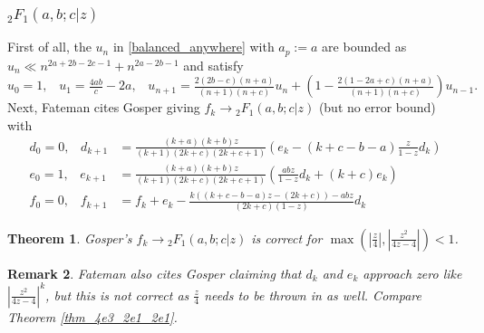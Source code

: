 \documentclass[12pt]{article}
\numberwithin{equation}{section}
\newtheorem{theorem}{Theorem}[section]
\newtheorem{remark}[theorem]{Remark}
\newcommand{\Head}[3] {{}_{#1}{#2}_{#3}}
\begin{document}
\subsubsection{$\Head{2}{F}{1}(a,b;c|z)$}
First of all, the $u_n$ in \eqref{balanced_anywhere} with $a_p:=a$ are bounded as $u_n \ll n^{2a+2b-2c-1} + n^{2a-2b-1}$ and satisfy
\begin{equation*}
u_0 = 1\text{,} \quad u_1 = \tfrac{4ab}{c}-2a\text{,} \quad 
u_{n+1} = \tfrac{2(2b-c)(n+a)}{(n+1)(n+c)} u_n + (1-\tfrac{2(1-2a+c)(n+a)}{(n+1)(n+c)}) u_{n-1}\text{.}
\end{equation*}
Next, Fateman cites Gosper giving $f_k \to \Head{2}{F}{1}(a,b;c|z)$ (but no error bound) with 
\begin{equation*}
\begin{aligned}
d_0 = 0\text{,} \quad d_{k+1} & = \tfrac{(k+a)(k+b)z}{(k+1)(2k+c)(2k+c+1)}(e_k-(k+c-b-a)\tfrac{z}{1-z} d_k)\\
e_0 =1\text{,} \quad e_{k+1} & = \tfrac{(k+a)(k+b)z}{(k+1)(2k+c)(2k+c+1)}(\tfrac{a b z}{1-z} d_k+(k+c) e_k)\\
f_0 = 0\text{,} \quad f_{k+1} &= f_{k} + e_k - \tfrac{k((k+c-b-a)z-(2k+c))-a b z}{(2k+c)(1-z)} d_k
\end{aligned}
\end{equation*}
\begin{theorem}
Gosper's $f_k \to \Head{2}{F}{1}(a,b;c|z)$ is correct for $\max(|\frac{z}{4}|,|\frac{z^2}{4z-4}|)<1$.
\end{theorem}
\begin{remark}
Fateman also cites Gosper claiming that $d_k$ and $e_k$ approach zero like $|\frac{z^2}{4z-4}|^k$, but this is not correct as $\frac{z}{4}$ needs to be thrown in as well. Compare Theorem \ref{thm_4e3_2e1_2e1}.
\end{remark}
\end{document}
